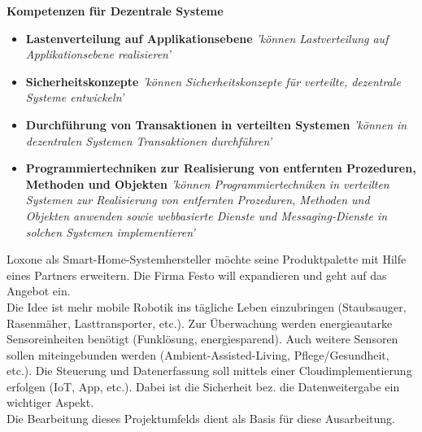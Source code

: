 \documentclass[letterpaper, 12pt]{article}
\begin{document}
\parindent 0pt
\parskip 6pt



\clearpage
\thispagestyle{empty}
\tableofcontents

\newpage
{}
\pagestyle{fancy}

\textbf{Kompetenzen für Dezentrale Systeme}

\begin{itemize}
	\item	\textbf{Lastenverteilung auf Applikationsebene} \newline
	\textit{'können Lastverteilung auf Applikationsebene realisieren'}
	\item 	\textbf{Sicherheitskonzepte} \newline
	\textit{'können Sicherheitskonzepte für verteilte, dezentrale Systeme entwickeln'}
	\item 	\textbf{Durchführung von Transaktionen in verteilten Systemen} \newline
	\textit{'können in dezentralen Systemen Transaktionen durchführen'}
	\item	\textbf{Programmiertechniken zur Realisierung von entfernten Prozeduren, Methoden und Objekten} \newline
	\textit{'können Programmiertechniken in verteilten Systemen zur Realisierung von entfernten Prozeduren, Methoden und Objekten anwenden sowie webbasierte Dienste und Messaging-Dienste in solchen Systemen implementieren'}
\end{itemize}


Loxone als Smart-Home-Systemhersteller möchte seine Produktpalette mit
Hilfe eines Partners erweitern. Die Firma Festo will expandieren und
geht auf das Angebot ein. \\
Die Idee ist mehr mobile Robotik ins tägliche Leben einzubringen
(Staubsauger, Rasenmäher, Lasttransporter, etc.). Zur Überwachung werden
energieautarke Sensoreinheiten benötigt (Funklösung, energiesparend).
Auch weitere Sensoren sollen miteingebunden werden
(Ambient-Assisted-Living, Pflege/Gesundheit, etc.).
Die Steuerung und Datenerfassung soll mittels einer Cloudimplementierung
erfolgen (IoT, App, etc.).
Dabei ist die Sicherheit bez. die Datenweitergabe ein wichtiger Aspekt. \\

Die Bearbeitung dieses Projektumfelds dient als Basis für diese Ausarbeitung.
\end{document}
